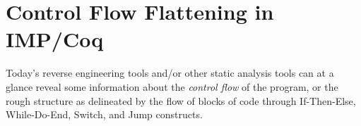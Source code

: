 \documentclass[compsoc,conference,a4paper,10pt,times]{IEEEtran}
\newtheorem{example}[theorem]{Example}
\begin{document}





\section{Control Flow Flattening in IMP/Coq}\label{sec:flattening}
Today's reverse engineering tools and/or other static analysis tools can at a glance reveal some information about the \emph{control flow} of the program, or the rough structure as delineated by the flow of blocks of code through If-Then-Else, While-Do-End, Switch, and Jump constructs. 
\end{document}
